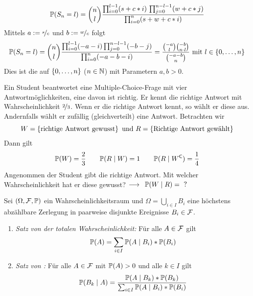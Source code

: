\begin{beispiel}
	\begin{equation*}
		\P(S_n = l) = \binom{n}{l} \frac{\prod_{i=0}^{l-1}(s+c * i) \, \prod_{j=0}^{n-l-1}(w + c * j)}{\prod_{i=0}^n(s+w+c * i)}
	\end{equation*}
	Mittels $a \defeq \lfrac{s}{c}$ und $b \defeq \lfrac{w}{c}$ folgt
	\begin{equation*}
		\begin{aligned}
			\P(S_n = l) = \binom{n}{l} \frac{\prod_{i=0}^{l-1}(-a-i)\prod_{j=0}^{n-l-1}(-b-j)}{\prod_{i=0}^n (-a-b-i)} = \frac{\binom{-a}{l}\binom{-b}{n \cdot l}}{\binom{-a-b}{n}} \mit l \in \menge{0,\dots,n} 
		\end{aligned}
	\end{equation*}
	Dies ist die  auf $\menge{0,\dots,n}$ ($n \in \N$) mit Parametern $a,b > 0$.
\end{beispiel}

\begin{beispiel} \label{beispiel_3_1_8_multiplechoice}
	Ein Student beantwortet eine Multiple-Choice-Frage mit vier Antwortmöglichkeiten, eine davon ist richtig. Er kennt die richtige Antwort mit Wahrscheinlichkeit $\lfrac{2}{3}$. Wenn er die richtige Antwort kennt, so wählt er diese aus. Andernfalls wählt er zufällig (gleichverteilt) eine Antwort. Betrachten wir 
	\begin{equation*}
		W = \menge{\text{richtige Antwort gewusst}} \und 
		R = \menge{\text{Richtige Antwort gewählt}}
	\end{equation*}
	Dann gilt
	\begin{equation*}
		\P(W) = \frac{2}{3} \qquad \P(R \mid W) = 1 \qquad \P(R \mid W^\complement) = \frac{1}{4}
	\end{equation*}
	Angenommen der Student gibt die richtige Antwort. Mit welcher Wahrscheinlichkeit hat er diese gewusst? $\longrightarrow \enskip \P(W \mid R) = \text{ ?}$
\end{beispiel}

\begin{satz} \label{satz: 3_1_9_totaleW_bayes}
	Sei $(\Omega, \F, \P)$ ein Wahrscheinlichkeitsraum und $\Omega = \bigcup_{i \in I} B_i$ eine höchstens abzählbare Zerlegung in paarweise disjunkte Ereignisse $B_i \in \F$.
	\begin{enumerate}
		\item \textit{Satz von der totalen Wahrscheinlichkeit:} Für alle $A \in \F$ gilt
		\begin{align}
			\P(A) = \sum_{i\in I} \P(A\mid B_i) * \P(B_i) \label{eq: totaleWkeit}
		\end{align} 
		\item \textit{Satz von :} Für alle $A \in \F$ mit $\P(A) > 0$ und alle $k \in I$ gilt
		\begin{align}
			\P(B_k \mid A) = \frac{\P(A \mid B_k) * \P(B_k)}{\sum_{i\in I}\P(A\mid B_i) * \P(B_i)} \label{eq: bayes}
		\end{align}
	\end{enumerate}
\end{satz}

